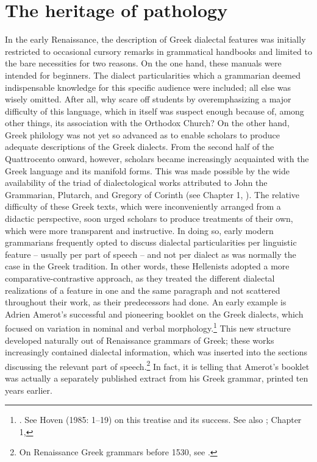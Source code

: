 \section{The heritage of pathology}\label{sec:6.2}

In the early Renaissance, the description of Greek dialectal features was initially restricted to occasional cursory remarks in grammatical handbooks and limited to the bare necessities for two reasons. On the one hand, these manuals were intended for beginners. The dialect particularities which a grammarian deemed indispensable knowledge for this specific audience were included; all else was wisely omitted. After all, why scare off students by overemphasizing a major difficulty of this language, which in itself was suspect enough because of, among other things, its association with the Orthodox Church? On the other hand, Greek philology was not yet so advanced as to enable scholars to produce adequate descriptions of the Greek dialects. From the second half of the Quattrocento onward, however, scholars became increasingly acquainted with the Greek language and its manifold forms. This was made possible by the wide availability of the triad of dialectological works attributed to John the Grammarian, Plutarch, and Gregory of Corinth (see Chapter 1, ). The relative difficulty of these Greek texts, which were inconveniently arranged from a didactic perspective, soon urged scholars to produce treatments of their own, which were more transparent and instructive. In doing so, early modern grammarians frequently opted to discuss dialectal particularities per linguistic feature – usually per part of speech – and not per dialect as was normally the case in the Greek tradition. In other words, these Hellenists adopted a more comparative-contrastive approach, as they treated the different dialectal realizations of a feature in one and the same paragraph and not scattered throughout their work, as their predecessors had done. An early example is Adrien Amerot’s successful and pioneering booklet on the Greek dialects, which focused on variation in nominal and verbal morphology.\footnote{{\citet{Amerot1530}. See Hoven (1985: 1–19) on this treatise and its success. See also \citet{Hummel1999}; Chapter 1, }} This new structure developed naturally out of Renaissance grammars of Greek; these works increasingly contained dialectal information, which was inserted into the sections discussing the relevant part of speech.\footnote{{On Renaissance Greek grammars before 1530, see \citet{Botley2010}.}} In fact, it is telling that Amerot’s booklet was actually a separately published extract from his Greek grammar, printed ten years earlier.

